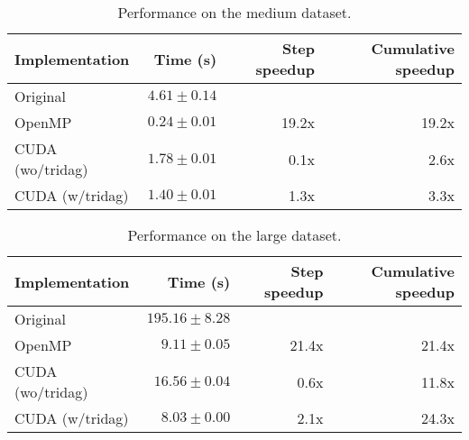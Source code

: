 \documentclass[a4paper]{article}
\begin{document}
\begin{table}
    \centering
    \begin{tabular}{lrrr}
        \toprule
        \textbf{Implementation} & \textbf{Time (s)} & \textbf{Step speedup} & \textbf{Cumulative speedup} \\
        \midrule
        Original         & $4.61\pm0.14$ &       &       \\
        OpenMP           & $0.24\pm0.01$ & 19.2x & 19.2x \\
        CUDA (wo/tridag) & $1.78\pm0.01$ &  0.1x &  2.6x \\
        CUDA (w/tridag)  & $1.40\pm0.01$ &  1.3x &  3.3x \\
        \bottomrule
    \end{tabular}
    \caption{Performance on the medium dataset.}
    \label{tbl:time_medium}
\end{table}

\begin{table}
    \centering
    \begin{tabular}{lrrr}
        \toprule
        \textbf{Implementation} & \textbf{Time (s)} & \textbf{Step speedup} & \textbf{Cumulative speedup} \\
        \midrule
        Original         & $195.16\pm8.28$ &       &       \\
        OpenMP           &   $9.11\pm0.05$ & 21.4x & 21.4x \\
        CUDA (wo/tridag) &  $16.56\pm0.04$ &  0.6x & 11.8x \\
        CUDA (w/tridag)  &   $8.03\pm0.00$ &  2.1x & 24.3x \\
        \bottomrule
    \end{tabular}
    \caption{Performance on the large dataset.}
    \label{tbl:time_large}
\end{table}
\end{document}
